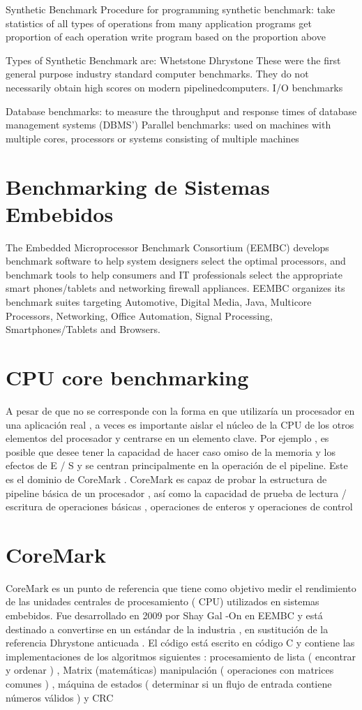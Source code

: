 	Synthetic Benchmark
		Procedure for programming synthetic benchmark:
			take statistics of all types of operations from many application programs
			get proportion of each operation
			write program based on the proportion above
	
		Types of Synthetic Benchmark are:
			Whetstone
			Dhrystone
		These were the first general purpose industry standard computer benchmarks. They do not necessarily obtain high scores on modern pipelinedcomputers.
	I/O benchmarks
	
	Database benchmarks: to measure the throughput and response times of database management systems (DBMS')
	Parallel benchmarks: used on machines with multiple cores, processors or systems consisting of multiple machines
	
	\section{Benchmarking de Sistemas Embebidos}
	The Embedded Microprocessor Benchmark Consortium (EEMBC) develops benchmark software to help system designers select the optimal processors, and
	benchmark tools to help consumers and IT professionals select the appropriate smart phones/tablets and networking firewall appliances. EEMBC
	organizes its benchmark suites targeting Automotive, Digital Media, Java, Multicore Processors, Networking, Office Automation, Signal Processing,
	Smartphones/Tablets and Browsers.
 	
	\section{CPU core benchmarking}
 	A pesar de que no se corresponde con la forma en que utilizaría un procesador en una aplicación real , a veces es importante aislar el núcleo de la
 	CPU de los otros elementos del procesador y centrarse en un elemento clave. Por ejemplo , es posible que desee tener la capacidad de hacer caso
 	omiso de la memoria y los efectos de E / S y se centran principalmente en la operación de el pipeline. Este es el dominio de CoreMark . CoreMark es
 	capaz de probar la estructura de pipeline básica de un procesador , así como la capacidad de prueba de lectura / escritura de operaciones básicas ,
 	operaciones de enteros y operaciones de control

	\section{CoreMark}

	CoreMark es un punto de referencia que tiene como objetivo medir el rendimiento de las unidades centrales de procesamiento ( CPU) utilizados en
	sistemas embebidos. Fue desarrollado en 2009 por Shay Gal -On en EEMBC y está destinado a convertirse en un estándar de la industria , en sustitución
	de la referencia Dhrystone anticuada . El código está escrito en código C y contiene las implementaciones de los algoritmos siguientes :
	procesamiento de lista ( encontrar y ordenar ) , Matrix (matemáticas) manipulación ( operaciones con matrices comunes ) , máquina de estados (
	determinar si un flujo de entrada contiene números válidos ) y CRC

